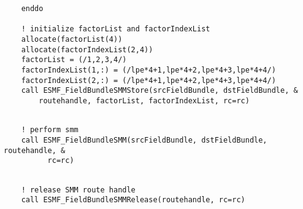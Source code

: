 
 \begin{verbatim}
    enddo

    ! initialize factorList and factorIndexList
    allocate(factorList(4))
    allocate(factorIndexList(2,4))
    factorList = (/1,2,3,4/)
    factorIndexList(1,:) = (/lpe*4+1,lpe*4+2,lpe*4+3,lpe*4+4/)
    factorIndexList(2,:) = (/lpe*4+1,lpe*4+2,lpe*4+3,lpe*4+4/)
    call ESMF_FieldBundleSMMStore(srcFieldBundle, dstFieldBundle, &
        routehandle, factorList, factorIndexList, rc=rc)
 
\end{verbatim}
 

 \begin{verbatim}
    ! perform smm
    call ESMF_FieldBundleSMM(srcFieldBundle, dstFieldBundle, routehandle, &
          rc=rc)
 
\end{verbatim}
 

 \begin{verbatim}
    ! release SMM route handle
    call ESMF_FieldBundleSMMRelease(routehandle, rc=rc)
 
\end{verbatim}

\setlength{\parskip}{\oldparskip}
\setlength{\parindent}{\oldparindent}
\setlength{\baselineskip}{\oldbaselineskip}
